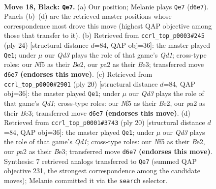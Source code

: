 \documentclass[11pt]{article}
\begin{document}
\clearpage

\begin{figure}[p]\centering
\begin{subfigure}{0.46\textwidth}\centering
\resizebox{\linewidth}{!}{%
\newchessgame
\chessboard[
  setfen={nrb2rk1/p4pbp/3q4/1pp1pn1P/8/3PPB2/PP3P2/RNBQNRK1 b - - 3 18},
  showmover=false,
  pgfstyle=straightmove, color=movearrow, markmove={d6-e7}
]}
\caption{}
\end{subfigure}\hfill
\begin{subfigure}{0.46\textwidth}\centering
\resizebox{\linewidth}{!}{%
\newchessgame
\chessboard[
  setfen={r1b1k2r/2q1bppp/p1pppn2/8/4PP2/2N1B3/PPP1B1PP/R2Q1RK1 w kq - 0 13},
  showmover=false,
  pgfstyle=straightmove, color=movearrow, markmove={d1-e1}
]}
\caption{}
\end{subfigure}
\\[4pt]
\begin{subfigure}{0.46\textwidth}\centering
\resizebox{\linewidth}{!}{%
\newchessgame
\chessboard[
  setfen={r1b1k2r/2q1bppp/p1pppn2/8/4PP2/2N1B3/PPP1B1PP/R2Q1RK1 w kq - 0 11},
  showmover=false,
  pgfstyle=straightmove, color=movearrow, markmove={d1-e1}
]}
\caption{}
\end{subfigure}\hfill
\begin{subfigure}{0.46\textwidth}\centering
\resizebox{\linewidth}{!}{%
\newchessgame
\chessboard[
  setfen={r1b1k2r/2q1bppp/p1pppn2/8/4PP2/2N1B3/PPP1B1PP/R2Q1RK1 w kq - 0 11},
  showmover=false,
  pgfstyle=straightmove, color=movearrow, markmove={d1-e1}
]}
\caption{}
\end{subfigure}
\caption{\textbf{Move 18, Black: \texttt{Qe7}.} (a) Our position; Melanie plays \texttt{Qe7} (\texttt{d6e7}). Panels (b)--(d) are the retrieved master positions whose correspondence most drove this move (highest QAP objective among those that transfer to it). (b) Retrieved from \texttt{ccrl\_top\_p0003\#245} (ply 24) [structural distance $d$=84, QAP obj=36]: the master played \texttt{Qe1}; under $\mu$ our \emph{Qd3} plays the role of that game's \emph{Qd1}; cross-type roles: our \emph{N}f5 as their \emph{B}e2, our \emph{p}a2 as their \emph{B}e3; transferred move \texttt{d6e7} \textbf{(endorses this move)}. (c) Retrieved from \texttt{ccrl\_top\_p0000\#2901} (ply 20) [structural distance $d$=84, QAP obj=36]: the master played \texttt{Qe1}; under $\mu$ our \emph{Qd3} plays the role of that game's \emph{Qd1}; cross-type roles: our \emph{N}f5 as their \emph{B}e2, our \emph{p}a2 as their \emph{B}e3; transferred move \texttt{d6e7} \textbf{(endorses this move)}. (d) Retrieved from \texttt{ccrl\_top\_p0001\#3743} (ply 20) [structural distance $d$=84, QAP obj=36]: the master played \texttt{Qe1}; under $\mu$ our \emph{Qd3} plays the role of that game's \emph{Qd1}; cross-type roles: our \emph{N}f5 as their \emph{B}e2, our \emph{p}a2 as their \emph{B}e3; transferred move \texttt{d6e7} \textbf{(endorses this move)}. Synthesis: 7 retrieved analogs transferred to \texttt{Qe7} (summed QAP objective 231, the strongest correspondence among the candidate moves); Melanie committed it via the \texttt{search} selector.}
\label{fig:thought-m35}
\end{figure}
\end{document}
